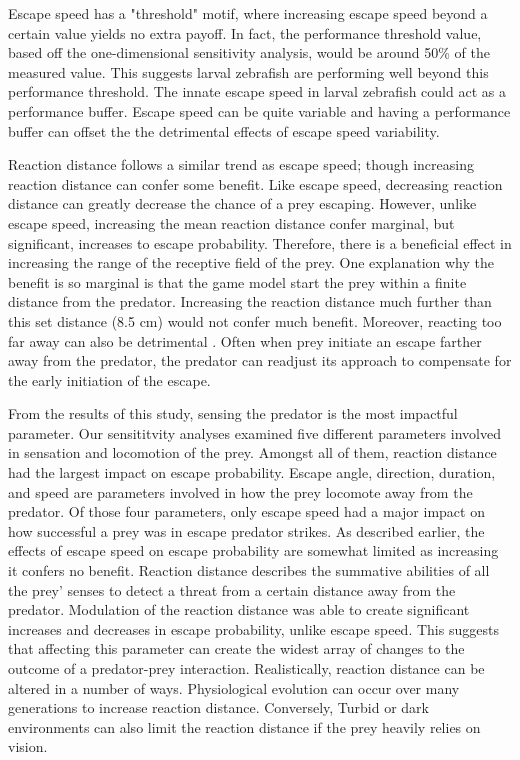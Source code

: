 \documentclass[]{rsos}%
\begin{document}
Escape speed has a "threshold" motif, where increasing escape speed beyond a certain value yields no extra payoff. 
In fact, the performance threshold value, based off the one-dimensional sensitivity analysis, would be around 50\% of the measured value.
This suggests larval zebrafish are performing well beyond this performance threshold. 
The innate escape speed in larval zebrafish could act as a performance buffer.
Escape speed can be quite variable and having a performance buffer can offset the the detrimental effects of escape speed variability.

Reaction distance follows a similar trend as escape speed; though increasing reaction distance can confer some benefit.
Like escape speed, decreasing reaction distance can greatly decrease the chance of a prey escaping.
However, unlike escape speed, increasing the mean reaction distance confer marginal, but significant, increases to escape probability.
Therefore, there is a beneficial effect in increasing the range of the receptive field of the prey. 
One explanation why the benefit is so marginal is that the game model start the prey within a finite distance from the predator.
Increasing the reaction distance much further than this set distance (8.5 cm) would not confer much benefit.
Moreover, reacting too far away can also be detrimental \cite{Stewart:2013bha}.
Often when prey initiate an escape farther away from the predator, the predator can readjust its approach to compensate for the early initiation of the escape.

From the results of this study, sensing the predator is the most impactful parameter.
Our sensititvity analyses examined five different parameters involved in sensation and locomotion of the prey.
Amongst all of them, reaction distance had the largest impact on escape probability. 
Escape angle, direction, duration, and speed are parameters involved in how the prey locomote away from the predator.
Of those four parameters, only escape speed had a major impact on how successful a prey was in escape predator strikes.
As described earlier, the effects of escape speed on escape probability are somewhat limited as increasing it confers no benefit.
Reaction distance describes the summative abilities of all the prey' senses to detect a threat from a certain distance away from the predator.
Modulation of the reaction distance was able to create significant increases and decreases in escape probability, unlike escape speed.
This suggests that affecting this parameter can create the widest array of changes to the outcome of a predator-prey interaction.
Realistically, reaction distance can be altered in a number of ways. 
Physiological evolution can occur over many generations to increase reaction distance.
Conversely, Turbid or dark environments can also limit the reaction distance if the prey heavily relies on vision.
\end{document}
